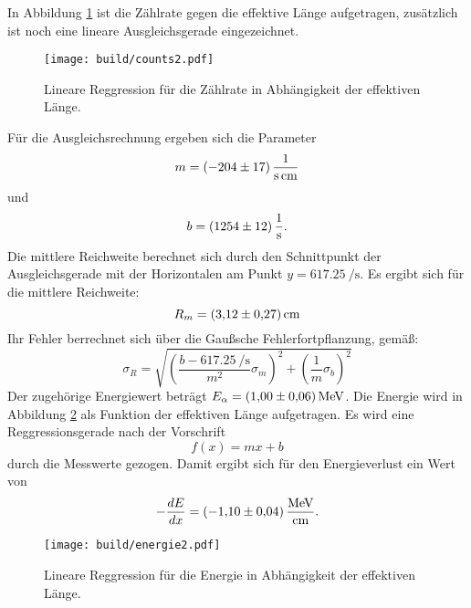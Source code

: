 \noindent In Abbildung \ref{fig:c2} ist die Zählrate gegen die effektive Länge aufgetragen, zusätzlich ist noch eine lineare Ausgleichsgerade eingezeichnet.
\begin{figure}[H]
  \centering
  \texttt{[image: build/counts2.pdf]}
  \caption{Lineare Reggression für die Zählrate in Abhängigkeit der effektiven Länge.}
  \label{fig:c2}
\end{figure}
\noindent Für die Ausgleichsrechnung ergeben sich die Parameter
\begin{equation*}
  m = \SI{-204\pm17}{\per\second\per\centi\meter}
\end{equation*}
und
\begin{equation*}
  b = \SI{1254\pm12}{\per\second}   .
\end{equation*}
Die mittlere Reichweite berechnet sich durch den Schnittpunkt der Ausgleichsgerade mit der Horizontalen am Punkt $y=\SI{617.25}{\per\second}$.
Es ergibt sich für die mittlere Reichweite:
\begin{equation}
  R_m= \SI{3.12\pm0.27}{\centi\meter}
\end{equation}
Ihr Fehler berrechnet sich über die Gaußsche Fehlerfortpflanzung, gemäß:
\begin{equation*}
    \sigma_R = \sqrt{\left(\frac{b-\SI{617.25}{\per\second}}{m^2}\sigma_m\right)^2 +\left(\frac{1}{m}\sigma_b\right)^2}
\end{equation*}
Der zugehörige Energiewert beträgt $E_{\alpha}=\SI{1.00\pm0.06}{\mega\electronvolt}$.
Die Energie wird in Abbildung \ref{fig:e2} als Funktion der effektiven Länge aufgetragen.
Es wird eine Reggressionsgerade nach der Vorschrift
\begin{equation*}
  f(x) = mx + b
\end{equation*}
durch die Messwerte gezogen.
Damit ergibt sich für den Energieverlust ein Wert von
\begin{equation*}
  -\frac{dE}{dx} =\SI{-1.10\pm0.04}{\mega\electronvolt\per\centi\meter} .
\end{equation*}

\begin{figure}[H]
  \centering
  \texttt{[image: build/energie2.pdf]}
  \caption{Lineare Reggression für die Energie in Abhängigkeit der effektiven Länge.}
  \label{fig:e2}
\end{figure}


